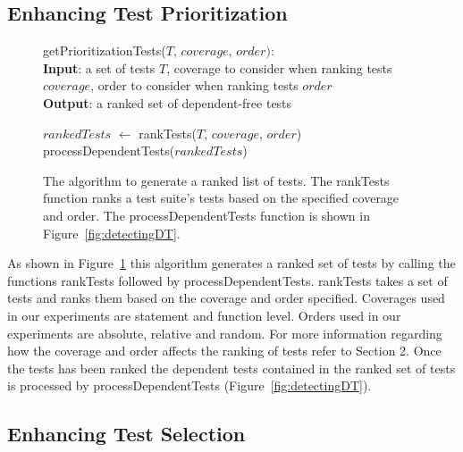 \subsection{Enhancing Test Prioritization}
\label{sec:enhanceprio}
\begin{figure}[t]
	getPrioritizationTests($\mathit{T}$, $\mathit{coverage}$, $\mathit{order}):$\\
	\textbf{Input}: a set of tests $\mathit{T}$, coverage to consider when ranking tests $\mathit{coverage}$, order to consider when ranking tests $\mathit{order}$\\
	\textbf{Output}: a ranked set of dependent-free tests\\
	 \begin{algorithmic}[1]
	 	\vspace{-5mm}
		\STATE $\mathit{rankedTests}$ $\leftarrow$ rankTests($\mathit{T}$, $\mathit{coverage}$, $\mathit{order}$)
		\RETURN processDependentTests($\mathit{rankedTests}$)
	\end{algorithmic}
	\vspace{-3mm}
	\caption {
		The algorithm to generate a ranked list of tests. The rankTests function ranks a test suite's tests based on the specified coverage and order. The processDependentTests function is shown in Figure~\ref{fig:detectingDT}.
	}
	\label{fig:prioritization}
\end{figure}
As shown in Figure~\ref{fig:prioritization} this algorithm generates a ranked set of tests by calling the functions rankTests followed by processDependentTests. rankTests takes a set of tests and ranks them based on the coverage and order specified. Coverages used in our experiments are statement and function level. Orders used in our experiments are absolute, relative and random. For more information regarding how the coverage and order affects the ranking of tests refer to Section 2. Once the tests has been ranked the dependent tests contained in the ranked set of tests is processed by processDependentTests (Figure~\ref{fig:detectingDT}).

\subsection{Enhancing Test Selection}
\label{sec:enhancesel}

